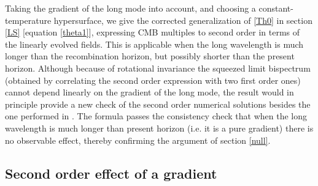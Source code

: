 \documentclass[12pt]{article}
\numberwithin{equation}{section}
\newcommand{\comment}[1]{}
\def\bsb{\boldsymbol}
\def\be{\begin{equation}}
\def\ee{\end{equation}}
\def\n{\bsb{\hat n}}
\begin{document}
Taking the gradient of the long mode into account, and choosing a constant-temperature hypersurface, we give the corrected generalization of \eqref{Th0} in section \ref{LS} [equation \eqref{theta1}], expressing CMB multiples to second order in terms of the linearly evolved fields. This is applicable when the long wavelength is much longer than the recombination horizon, but possibly shorter than the present horizon. Although because of rotational invariance the squeezed limit bispectrum (obtained by correlating the second order expression with two first order ones) cannot depend linearly on the gradient of the long mode, the result would in principle provide a new check of the second order numerical solutions besides the one performed in \cite{Creminelli_squeezed,Huang}. The formula passes the consistency check that when the long wavelength is much longer than present horizon (i.e. it is a pure gradient) there is no observable effect, thereby confirming the argument of section \ref{null}. 
\comment{
\be
\Theta(\bsb{\hat n})=\Theta_{S,\rm obs}+\Theta_{L,\rm obs}+\Theta_{L,\rm obs}\Theta_{S,\rm obs}+\Delta\bsb x_e\cdot \nabla \Theta_{S,\rm obs} - \Delta\bsb n \cdot \tilde{\bsb v}
\ee
where $\Delta \n$ and $\Delta\bsb x_e$ are defined respectively in \eqref{Dn} and \eqref{delT} in section \ref{LS}.}

\subsection{Second order effect of a gradient\label{adia2}}
\end{document}
